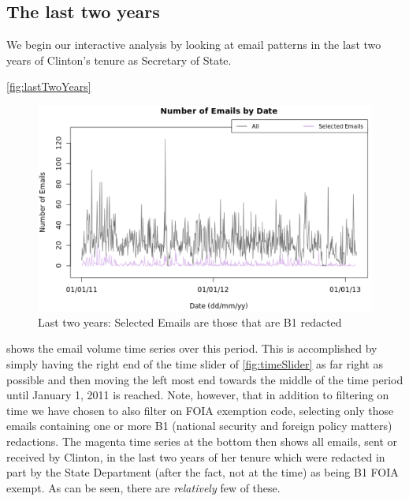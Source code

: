\documentclass[journal]{vgtc}                %
\begin{document}
\subsection{The last two years}
We begin our interactive analysis by looking at  email patterns in the last two years of Clinton's tenure as Secretary of State.  

\autoref{fig:lastTwoYears} 
\begin{figure}[h]
\begin{center}
\includegraphics[width=0.95\linewidth]{EmailVolumeB1LastTwoYears}
\caption{Last two years:  Selected Emails are those that are B1 redacted}
\label{fig:lastTwoYears}
\end{center}
\end{figure}
shows the email volume time series over this period. 
This is accomplished by simply having the right end of the time slider of \autoref{fig:timeSlider} as far right as possible and then moving the left most end towards the middle of the time period until January 1, 2011 is reached.   Note, however, that in addition to filtering on time we have chosen to also filter on FOIA exemption code, selecting only those emails containing one or more B1 (national security and foreign policy matters) redactions.  The magenta time series at the bottom then shows all emails, sent or received by Clinton, in the last two years of her tenure which were redacted in part by the State Department (after the fact, not at the time) as being B1 FOIA exempt.  As can be seen, there are \emph{relatively} few of these.
\end{document}
